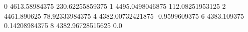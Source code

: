 0 4613.58984375 230.62255859375
1 4495.0498046875 112.08251953125
2 4461.890625 78.92333984375
4 4382.00732421875 -0.9599609375
6 4383.109375 0.14208984375
8 4382.96728515625 0.0
